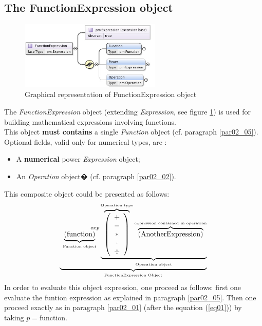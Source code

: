 \documentclass[a4paper,11pt] {ivoa}
\begin{document}
\subsection{The FunctionExpression object} \label{functionExpressionPar}
\begin{figure}[htbp]
\begin{center}
\includegraphics[width=0.6\textwidth]{pictures/FunctionExpression.jpg} 
\caption{Graphical representation of FunctionExpression object}
\label{Pic-FunctionExpression}
\end{center}
\end{figure}
The {\it FunctionExpression} object (extending {\it Expression}, see figure
\ref{Pic-FunctionExpression}) is used for building mathematical expressions involving functions.\\
This object {\bf must contains} a single {\it Function} object (cf. paragraph \ref{par02_05}).\\
Optional fields, valid only for numerical types, are :
\begin{itemize}
\item A {\bf numerical} power {\it Expression} object;
\item An {\it Operation} object� (cf. paragraph \ref{par02_02}).\\
\end{itemize}

This composite object could be presented as follows:
\begin{equation}
 \underbrace{    \underbrace{ \left(\mbox{function}\right) }_{\mbox{\tiny Function object}} ^{\hspace{15mm}exp} \underbrace{  \overbrace{\left( \begin{array}{c} + \\ - \\ \ast  \\ \cdot \\ \div   \end{array} \right) }^{\mbox{\tiny Operation type}}
 \overbrace{    \left( \mbox{AnotherExpression}\right) }^{\mbox{\tiny expression contained in operation}}   }_{\mbox{\tiny Operation object}}}_{\mbox{\tiny FunctionExpression Object}}
\end{equation}
In order to evaluate this object expression, one proceed as follows: first one evaluate the funtion
expression as explained in paragraph  \ref{par02_05}. Then one proceed exactly as in paragraph
\ref{par02_01} (after the equation (\ref{eq01})) by taking $p=$function.
\end{document}
